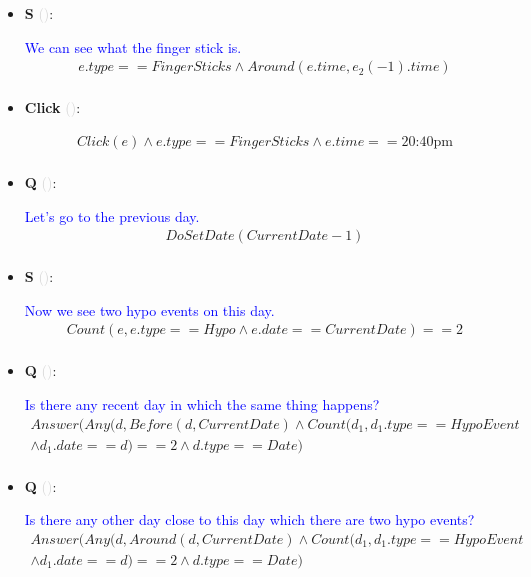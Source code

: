 \documentclass[11pt]{article}
\newcounter{CQ}
\newcounter{CS}
\newcounter{CClick}
\newcommand{\key}[1]{\textcolor{lightgray}{#1}}
\begin{document}
\begin{itemize}
    
	\item
	\textbf{S\theCS} \key{()}: \addtocounter{CS}{1}
	\textcolor{blue}{ We can see what the finger stick is. }
	\begin{multline*}
	e.type == FingerSticks \wedge Around(e.time, e_2(-1).time)\\
	\end{multline*}
	
	\item
	\textbf{Click\theCClick} \key{()}: \addtocounter{CClick}{1}
	\begin{multline*}
	Click(e) \wedge e.type == FingerSticks \wedge e.time == \mbox{20:40pm} \\
	\end{multline*}
	
	\item
	\textbf{Q\theCQ} \key{()}: \addtocounter{CQ}{1}
	\textcolor{blue}{ Let's go to the previous day. }
	\begin{multline*}
	DoSetDate(CurrentDate - 1) \\
	\end{multline*}
	

	\item
	\textbf{S\theCS} \key{()}: \addtocounter{CS}{1}
	\textcolor{blue}{ Now we see two hypo events on this day. }
	\begin{multline*}
	Count(e, e.type==Hypo \wedge e.date == CurrentDate) == 2 \\
	\end{multline*}
	
	\item
	\textbf{Q\theCQ} \key{()}: \addtocounter{CQ}{1}
	\textcolor{blue}{ Is there any recent day in which the same thing happens? }
	\begin{multline*}
	Answer(Any(d, Before(d, CurrentDate) \wedge Count(d_1, d_1.type==HypoEvent \\
	\wedge d_1.date==d)==2 \wedge d.type==Date) \\
	\end{multline*}
	
	\item
	\textbf{Q\theCQ} \key{()}: \addtocounter{CQ}{1}
	\textcolor{blue}{ Is there any other day close to this day which there are two hypo events? }
	\begin{multline*}
	Answer(Any(d, Around(d, CurrentDate) \wedge Count(d_1, d_1.type==HypoEvent \\
	\wedge d_1.date==d)==2 \wedge d.type==Date) \\
	\end{multline*}
	

\end{itemize}
\end{document}
